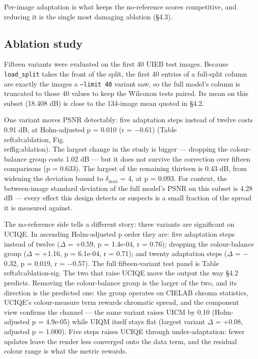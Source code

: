 \documentclass[journal]{IEEEtran}
\begin{document}
Per-image adaptation is what keeps the no-reference scores competitive, and reducing it is the single most damaging ablation (\S{}4.3).

\subsection{Ablation study}
Fifteen variants were evaluated on the first 40 UIEB test images. Because \texttt{load\_split} takes the front of the split, the first 40 entries of a full-split column are exactly the images a \texttt{--limit 40} variant saw, so the full model's column is truncated to those 40 values to keep the Wilcoxon tests paired. Its mean on this subset (18.408 dB) is close to the 134-image mean quoted in \S{}4.2.

One variant moves PSNR detectably: five adaptation steps instead of twelve costs 0.91 dB, at Holm-adjusted p = 0.010 (r = $-$0.61) (Table~\\ref{tab:ablation}, Fig.~\\ref{fig:ablation}). The largest change in the study is bigger --- dropping the colour-balance group costs 1.02 dB --- but it does not survive the correction over fifteen comparisons (p = 0.633). The largest of the remaining thirteen is 0.43 dB, from widening the deviation bound to $\delta_{\max}$ = 4, at p = 0.093. For context, the between-image standard deviation of the full model's PSNR on this subset is 4.28 dB --- every effect this design detects or suspects is a small fraction of the spread it is measured against.

The no-reference side tells a different story: three variants are significant on UCIQE. In ascending Holm-adjusted p order they are: five adaptation steps instead of twelve ($\Delta$ = +0.59, p = 1.4e-04, r = 0.76); dropping the colour-balance group ($\Delta$ = +1.16, p = 6.1e-04, r = 0.71); and twenty adaptation steps ($\Delta$ = $-$0.32, p = 0.019, r = $-$0.57). The full fifteen-variant test panel is Table~\\ref{tab:ablation-sig}. The two that raise UCIQE move the output the way \S{}4.2 predicts. Removing the colour-balance group is the larger of the two, and its direction is the predicted one: the group operates on CIELAB chroma statistics, UCIQE's colour-measure term rewards chromatic spread, and the component view confirms the channel --- the same variant raises UICM by 0.10 (Holm-adjusted p = 4.9e-05) while UIQM itself stays flat (largest variant $\Delta$ = +0.08, adjusted p = 1.000). Five steps raises UCIQE through under-adaptation: fewer updates leave the render less converged onto the data term, and the residual colour range is what the metric rewards.
\end{document}

